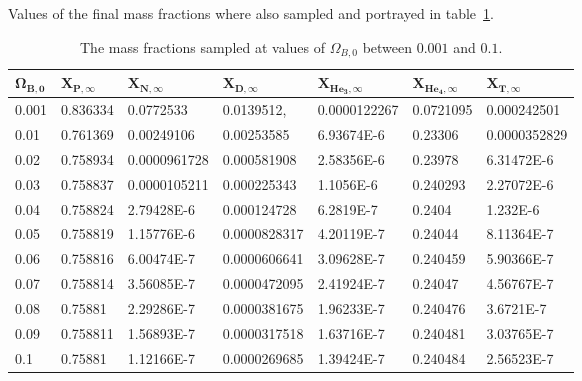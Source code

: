 \documentclass[twoside]{article}
\begin{document}
Values of the final mass fractions where also sampled and portrayed in table~\ref{t:diffFracs}.

\begin{table}[h!]
  \begin{center}
    \begin{tabular}{l |l |l |l |l |l |l }
    \hline
    $\boldsymbol{\Omega_{B,0}}$ & $\boldsymbol{X_{P,\infty}}$ & $\boldsymbol{X_{N,\infty}}$ & $\boldsymbol{X_{D,\infty}}$ & $\boldsymbol{X_{He_{3},\infty}}$ & $\boldsymbol{X_{He_{4},\infty}}$ & $\boldsymbol{X_{T,\infty}}$ \\\hline
  
0.001 & 0.836334 & 0.0772533 & 0.0139512, 
 & 0.0000122267 & 0.0721095 &  0.000242501\\
0.01 & 0.761369 & 0.00249106  &  0.00253585 
 &  6.93674E-6 & 0.23306 & 0.0000352829\\
0.02 & 0.758934 & 0.0000961728 & 0.000581908 & 2.58356E-6 & 0.23978 & 6.31472E-6\\
0.03 & 0.758837 &  0.0000105211 &  0.000225343 & 1.1056E-6 & 0.240293 & 2.27072E-6\\
0.04 &  0.758824 &  2.79428E-6 & 0.000124728 
   &  6.2819E-7 &  0.2404 &  1.232E-6\\
 0.05 &  0.758819 &  1.15776E-6 &  0.0000828317
  &  4.20119E-7 &  0.24044 &  8.11364E-7\\
 0.06 & 0.758816 & 6.00474E-7 &  0.0000606641
   &  3.09628E-7 &  0.240459 &  5.90366E-7\\
 0.07 &  0.758814 &  3.56085E-7 &  0.0000472095
   &  2.41924E-7 &  0.24047 & 4.56767E-7\\
 0.08 &  0.75881 & 2.29286E-7 &  0.0000381675
   & 1.96233E-7 & 0.240476 & 3.6721E-7\\
 0.09 & 0.758811 & 1.56893E-7 &  
  0.0000317518 & 1.63716E-7 & 0.240481 & 
  3.03765E-7\\
0.1 & 0.75881 & 1.12166E-7 & 
  0.0000269685 & 1.39424E-7 &  0.240484 &  
  2.56523E-7\\
    \hline
    \end{tabular}
  \end{center}
  \caption{The mass fractions sampled at values of $\Omega_{B,0}$ between $0.001$ and $0.1$.}\label{t:diffFracs}
\end{table}




\pagebreak
\newpage
\end{document}
